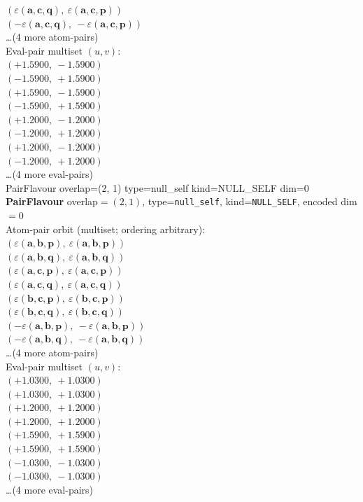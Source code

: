 \documentclass[a4paper,11pt]{article}
\newcommand{\kblbmcpggoncpf}[3]{\varepsilon(\mathbf{#1},\mathbf{#2},\mathbf{#3})}
\begin{document}
$(\kblbmcpggoncpf{a}{c}{q},\ \kblbmcpggoncpf{a}{c}{p})$\\
$(-\kblbmcpggoncpf{a}{c}{q},\ -\kblbmcpggoncpf{a}{c}{p})$\\
\quad \ldots (4 more atom-pairs)\\
\quad Eval-pair multiset $(u, v)$:\\
$(+1.5900,\ -1.5900)$\\
$(-1.5900,\ +1.5900)$\\
$(+1.5900,\ -1.5900)$\\
$(-1.5900,\ +1.5900)$\\
$(+1.2000,\ -1.2000)$\\
$(-1.2000,\ +1.2000)$\\
$(+1.2000,\ -1.2000)$\\
$(-1.2000,\ +1.2000)$\\
\quad \ldots (4 more eval-pairs)\\
    PairFlavour  overlap=(2, 1)  type=null\_self  kind=NULL\_SELF  dim=0
\textbf{PairFlavour} overlap$=(2, 1)$, type=\texttt{null\_self}, kind=\texttt{NULL\_SELF}, encoded dim$=0$\\
\quad Atom-pair orbit (multiset; ordering arbitrary):\\
$(\kblbmcpggoncpf{a}{b}{p},\ \kblbmcpggoncpf{a}{b}{p})$\\
$(\kblbmcpggoncpf{a}{b}{q},\ \kblbmcpggoncpf{a}{b}{q})$\\
$(\kblbmcpggoncpf{a}{c}{p},\ \kblbmcpggoncpf{a}{c}{p})$\\
$(\kblbmcpggoncpf{a}{c}{q},\ \kblbmcpggoncpf{a}{c}{q})$\\
$(\kblbmcpggoncpf{b}{c}{p},\ \kblbmcpggoncpf{b}{c}{p})$\\
$(\kblbmcpggoncpf{b}{c}{q},\ \kblbmcpggoncpf{b}{c}{q})$\\
$(-\kblbmcpggoncpf{a}{b}{p},\ -\kblbmcpggoncpf{a}{b}{p})$\\
$(-\kblbmcpggoncpf{a}{b}{q},\ -\kblbmcpggoncpf{a}{b}{q})$\\
\quad \ldots (4 more atom-pairs)\\
\quad Eval-pair multiset $(u, v)$:\\
$(+1.0300,\ +1.0300)$\\
$(+1.0300,\ +1.0300)$\\
$(+1.2000,\ +1.2000)$\\
$(+1.2000,\ +1.2000)$\\
$(+1.5900,\ +1.5900)$\\
$(+1.5900,\ +1.5900)$\\
$(-1.0300,\ -1.0300)$\\
$(-1.0300,\ -1.0300)$\\
\quad \ldots (4 more eval-pairs)\\
\end{document}
